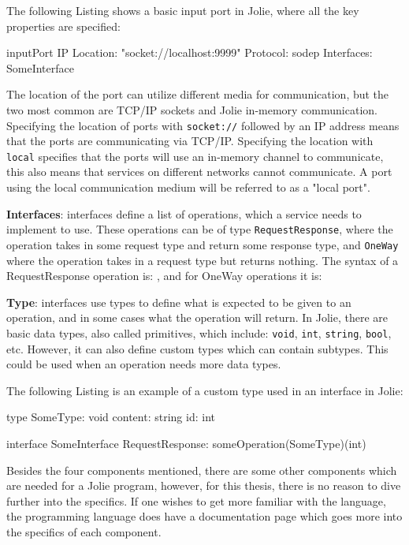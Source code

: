 The following Listing shows a basic input port in Jolie, where all the key properties are specified:

\begin{jolisting}[][caption={
    },label=lst:simple-inputport]
inputPort IP {
    Location: "socket://localhost:9999"
    Protocol: sodep
    Interfaces: SomeInterface
}
\end{jolisting}

The location of the port can utilize different media for communication, but the two most common are TCP/IP sockets and Jolie in-memory communication.
Specifying the location of ports with \texttt{socket://} followed by an IP address means that the ports are communicating via TCP/IP.
Specifying the location with \texttt{local} specifies that the ports will use an in-memory channel to communicate, this also means that services on different networks cannot communicate.
A port using the local communication medium will be referred to as a "local port".

\textbf{Interfaces}: interfaces define a list of operations, which a service needs to implement to use. These operations can be of type \texttt{RequestResponse}, where the operation takes in some request type and return some response type, 
and \texttt{OneWay} where the operation takes in a request type but returns nothing. The syntax of a RequestResponse operation is: , and for OneWay operations it is: 

\textbf{Type}: interfaces use types to define what is expected to be given to an operation, and in some cases what the operation will return. In Jolie, there are basic
data types, also called primitives, which include: \texttt{void}, \texttt{int}, \texttt{string}, \texttt{bool}, etc. However, it can also define custom types which can contain subtypes.
This could be used when an operation needs more data types.

The following Listing is an example of a custom type used in an interface in Jolie:
\begin{jolisting}[][caption={
    },label=lst:type-with-interf]
type SomeType: void {
    content: string
    id: int
}

interface SomeInterface {
    RequestResponse:
        someOperation(SomeType)(int)
}
\end{jolisting}

Besides the four components mentioned, there are some other components which are needed for a Jolie program, however, for this thesis, there is no reason to dive further into the specifics.
If one wishes to get more familiar with the language, the programming language does have a documentation page which goes more into the specifics of each component.

